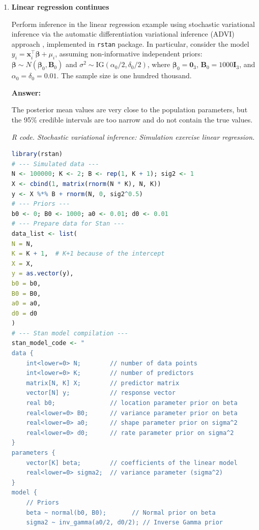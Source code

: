 \begin{enumerate}[leftmargin=*]
\item \textbf{Linear regression continues}

Perform inference in the linear regression example using stochastic variational inference via the automatic differentiation variational inference (ADVI) approach \cite{kucukelbir2017automatic}, implemented in \texttt{rstan} package. In particular, consider the model $y_i = \boldsymbol{x}_i^{\top} \boldsymbol{\beta} + \mu_i$, assuming non-informative independent priors: $\boldsymbol{\beta} \sim N(\boldsymbol{\beta}_0, \boldsymbol{B}_0)$ and $\sigma^2 \sim \mathrm{IG}(\alpha_0/2, \delta_0/2)$, where $\boldsymbol{\beta}_0 = \boldsymbol{0}_3$, $\boldsymbol{B}_0 = 1000\boldsymbol{I}_3$, and $\alpha_0 = \delta_0 = 0.01$. The sample size is one hundred thousand.

\textbf{Answer:}

The posterior mean values are very close to the population parameters, but the 95\% credible intervals are too narrow and do not contain the true values.

\begin{tcolorbox}[enhanced,width=4.67in,center upper,
	fontupper=\large\bfseries,drop shadow southwest,sharp corners]
	\textit{R code. Stochastic variational inference: Simulation exercise linear regression.}
	\begin{VF}
		\begin{lstlisting}[language=R]
library(rstan)
# --- Simulated data ---
N <- 100000; K <- 2; B <- rep(1, K + 1); sig2 <- 1
X <- cbind(1, matrix(rnorm(N * K), N, K))
y <- X %*% B + rnorm(N, 0, sig2^0.5)
# --- Priors ---
b0 <- 0; B0 <- 1000; a0 <- 0.01; d0 <- 0.01
# --- Prepare data for Stan ---
data_list <- list(
N = N,
K = K + 1,  # K+1 because of the intercept
X = X,
y = as.vector(y),
b0 = b0,
B0 = B0,
a0 = a0,
d0 = d0
)
# --- Stan model compilation ---
stan_model_code <- "
data {
	int<lower=0> N;        // number of data points
	int<lower=0> K;        // number of predictors
	matrix[N, K] X;        // predictor matrix
	vector[N] y;           // response vector
	real b0;               // location parameter prior on beta
	real<lower=0> B0;      // variance parameter prior on beta
	real<lower=0> a0;      // shape parameter prior on sigma^2
	real<lower=0> d0;      // rate parameter prior on sigma^2
}
parameters {
	vector[K] beta;        // coefficients of the linear model
	real<lower=0> sigma2;  // variance parameter (sigma^2)
}
model {
	// Priors
	beta ~ normal(b0, B0);       // Normal prior on beta
	sigma2 ~ inv_gamma(a0/2, d0/2); // Inverse Gamma prior
	

\end{lstlisting}
\end{VF}
\end{tcolorbox}
\end{enumerate}
